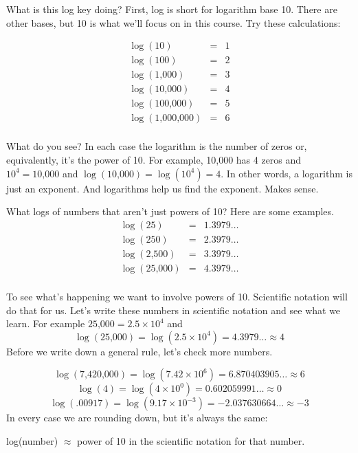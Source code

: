 What is this log key doing?  First, log is short for logarithm base 10.  There are other bases, but 10 is what we'll focus on in this course.  Try these calculations:

\begin{eqnarray*}
\log (10) & = & 1 \\
\log (100) & = & 2 \\
\log (\text{1,000}) & = & 3 \\
\log (\text{10,000}) & = & 4 \\
\log (\text{100,000}) & = & 5 \\
\log (\text{1,000,000}) & = & 6 \\
\end{eqnarray*}
\vspace{-.5in} %

What do you see?  In each case the logarithm is the number of zeros or, equivalently, it's the power of 10.  For example, 10,000 has 4 zeros and $10^4= \text{10,000}$ and $\log(\text{10,000}) = \log(10^4)=4$. In other words, a logarithm is just an exponent. And logarithms help us find the exponent.  Makes sense.

What logs of numbers that aren't just powers of 10? Here are some examples.
\begin{eqnarray*}
\log (25) & = & 1.3979\ldots \\
\log (250) & = & 2.3979\ldots \\
\log (\text{2,500}) & = & 3.3979\ldots \\
\log (\text{25,000}) & = & 4.3979\ldots \\
\end{eqnarray*}
\vspace{-.5in} %

To see what's happening we want to involve powers of 10.  Scientific notation will do that for us.  Let's write these numbers in scientific notation and see what we learn.  For example $ \text{25,000} = 2.5 \times 10^4$ and 
$$ \log( \text{25,000})=\log(2.5 \times 10 ^4)=4.3979\ldots \approx 4$$
Before we write down a general rule, let's check more numbers.

$$\log(\text{7,420,000}) = \log(7.42 \times 10^6)=6.870403905\ldots \approx 6$$ 
$$\log (\text{4})=\log(4 \times 10^0)=0.602059991\ldots \approx 0$$ 
$$\log (\text{.00917})= \log(9.17 \times 10^{-3}) = -2.037630664\ldots \approx -3$$
In every case we are rounding down, but it's always the same:

\begin{center}
log(number) $\approx$ power of 10 in the scientific notation for that number.
\end{center}

